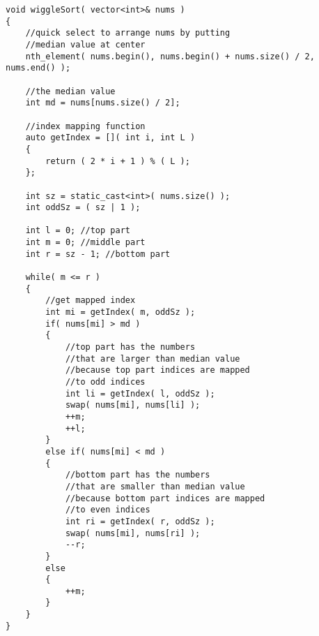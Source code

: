\begin{lstlisting}[style=customc, caption={Quick Select And Three-way Partition}]
void wiggleSort( vector<int>& nums )
{
    //quick select to arrange nums by putting
    //median value at center
    nth_element( nums.begin(), nums.begin() + nums.size() / 2, nums.end() );

    //the median value
    int md = nums[nums.size() / 2];

    //index mapping function
    auto getIndex = []( int i, int L )
    {
        return ( 2 * i + 1 ) % ( L );
    };

    int sz = static_cast<int>( nums.size() );
    int oddSz = ( sz | 1 );

    int l = 0; //top part
    int m = 0; //middle part
    int r = sz - 1; //bottom part

    while( m <= r )
    {
        //get mapped index
        int mi = getIndex( m, oddSz );
        if( nums[mi] > md )
        {
            //top part has the numbers
            //that are larger than median value
            //because top part indices are mapped
            //to odd indices
            int li = getIndex( l, oddSz );
            swap( nums[mi], nums[li] );
            ++m;
            ++l;
        }
        else if( nums[mi] < md )
        {
            //bottom part has the numbers
            //that are smaller than median value
            //because bottom part indices are mapped
            //to even indices
            int ri = getIndex( r, oddSz );
            swap( nums[mi], nums[ri] );
            --r;
        }
        else
        {
            ++m;
        }
    }
}

\end{lstlisting}
